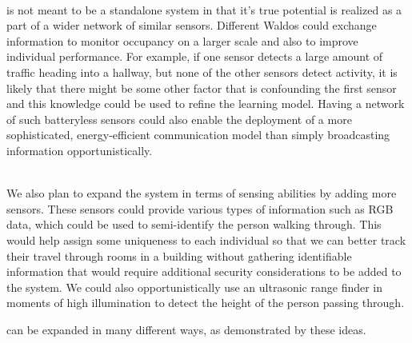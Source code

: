 \\\sysname is not meant to be a standalone system in that it's true potential is realized as a part of a wider network of similar sensors.
Different Waldos could exchange information to monitor occupancy on a larger scale and also to improve individual performance.
For example, if one sensor detects a large amount of traffic heading into a hallway, but none of the other sensors detect activity, it is likely that there might be some other factor that is confounding the first sensor and this knowledge could be used to refine the learning model.
Having a network of such batteryless sensors could also enable the deployment of a more sophisticated, energy-efficient communication model than simply broadcasting information opportunistically.

\\We also plan to expand the system in terms of sensing abilities by adding more sensors.
These sensors could provide various types of information such as RGB data, which could be used to semi-identify the person walking through.
This would help assign some uniqueness to each individual so that we can better track their travel through rooms in a building without gathering identifiable information that would require additional security considerations to be added to the system.
We could also opportunistically use an ultrasonic range finder in moments of high illumination to detect the height of the person passing through.

\sysname can be expanded in many different ways, as demonstrated by these ideas.




